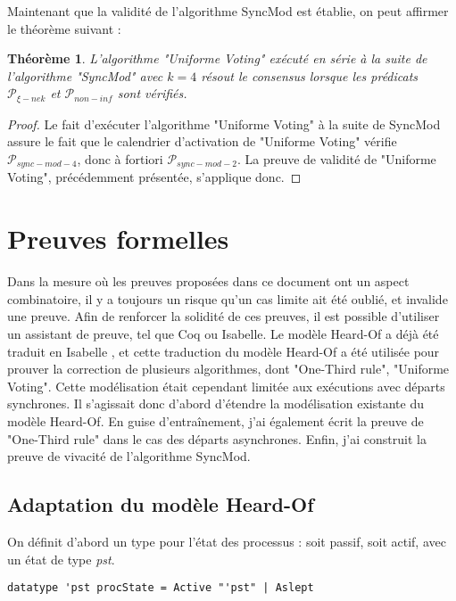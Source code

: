 \documentclass{article}
\newtheorem{theorem}{Théorème}
\begin{document}
Maintenant que la validité de l'algorithme SyncMod est établie, on peut affirmer le théorème suivant :

\begin{theorem}
	L'algorithme "Uniforme Voting" exécuté en série à la suite de l'algorithme "SyncMod" avec $k = 4$
	résout le consensus lorsque les prédicats $\mathcal{P}_{\xi-nek}$ et $\mathcal{P}_{non-inf}$ sont vérifiés.
\end{theorem}
\begin{proof}
	Le fait d'exécuter l'algorithme "Uniforme Voting" à la suite de SyncMod assure le fait que le calendrier d'activation de "Uniforme Voting" vérifie $\mathcal{P}_{sync-mod-4}$,
	donc à fortiori $\mathcal{P}_{sync-mod-2}$.
	La preuve de validité de "Uniforme Voting", précédemment présentée, s'applique donc.
\end{proof}

\section{Preuves formelles}

Dans la mesure où les preuves proposées dans ce document ont un aspect combinatoire, il y a toujours un risque qu'un cas limite ait été oublié, et invalide une preuve.
Afin de renforcer la solidité de ces preuves, il est possible d'utiliser un assistant de preuve, tel que Coq ou Isabelle.
Le modèle Heard-Of a déjà été traduit en Isabelle \cite{HO_isa},
et cette traduction du modèle Heard-Of a été utilisée pour prouver la correction de plusieurs algorithmes, dont "One-Third rule", "Uniforme Voting".
Cette modélisation était cependant limitée aux exécutions avec départs synchrones.
Il s'agissait donc d'abord d'étendre la modélisation existante du modèle Heard-Of.
En guise d'entraînement, j'ai également écrit la preuve de "One-Third rule" dans le cas des départs asynchrones.
Enfin, j'ai construit la preuve de vivacité de l'algorithme SyncMod.

\subsection{Adaptation du modèle Heard-Of}

On définit d'abord un type pour l'état des processus : soit passif, soit actif, avec un état de type \textit{pst}.

\begin{lstlisting}
datatype 'pst procState = Active "'pst" | Aslept
\end{lstlisting}
\end{document}

